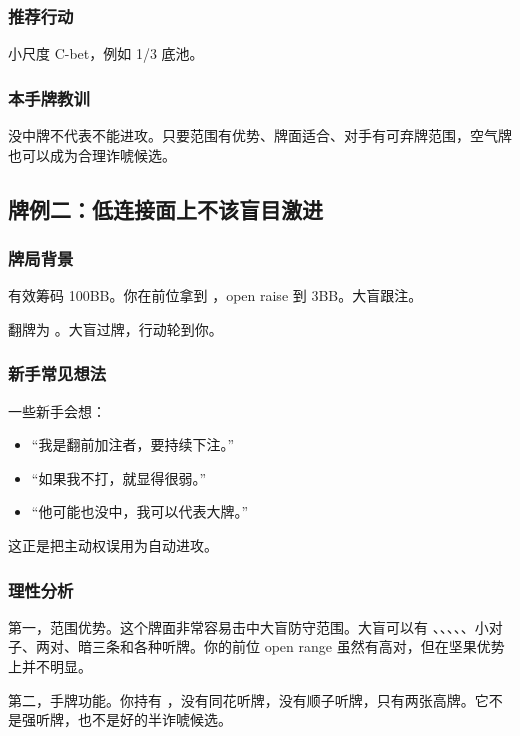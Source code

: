 \subsubsection*{推荐行动}

小尺度 C-bet，例如 1/3 底池。

\subsubsection*{本手牌教训}

没中牌不代表不能进攻。只要范围有优势、牌面适合、对手有可弃牌范围，空气牌也可以成为合理诈唬候选。

\subsection{牌例二：低连接面上不该盲目激进}

\subsubsection*{牌局背景}

有效筹码 100BB。你在前位拿到 ，open raise 到 3BB。大盲跟注。

翻牌为 。大盲过牌，行动轮到你。

\subsubsection*{新手常见想法}

一些新手会想：

\begin{itemize}
\item “我是翻前加注者，要持续下注。”
\item “如果我不打，就显得很弱。”
\item “他可能也没中，我可以代表大牌。”
\end{itemize}

这正是把主动权误用为自动进攻。

\subsubsection*{理性分析}

第一，范围优势。这个牌面非常容易击中大盲防守范围。大盲可以有 、、、、、小对子、两对、暗三条和各种听牌。你的前位 open range 虽然有高对，但在坚果优势上并不明显。

第二，手牌功能。你持有 ，没有同花听牌，没有顺子听牌，只有两张高牌。它不是强听牌，也不是好的半诈唬候选。

